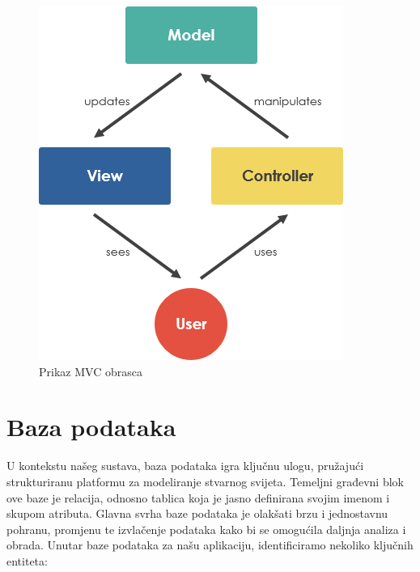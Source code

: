 \begin{figure} [H]

	\includegraphics[width=1\linewidth]{slike/mvc.png}
	\centering
	\caption{Prikaz MVC obrasca}
	\label{fig:Prikaz MVC obrasca}
\end{figure}

\section{Baza podataka}

U kontekstu našeg sustava, baza podataka igra ključnu ulogu, pružajući strukturiranu platformu za modeliranje stvarnog svijeta. Temeljni građevni blok ove baze je relacija, odnosno tablica koja je jasno definirana svojim imenom i skupom atributa. Glavna svrha baze podataka je olakšati brzu i jednostavnu pohranu, promjenu te izvlačenje podataka kako bi se omogućila daljnja analiza i obrada. Unutar baze podataka za našu aplikaciju, identificiramo nekoliko ključnih entiteta:

